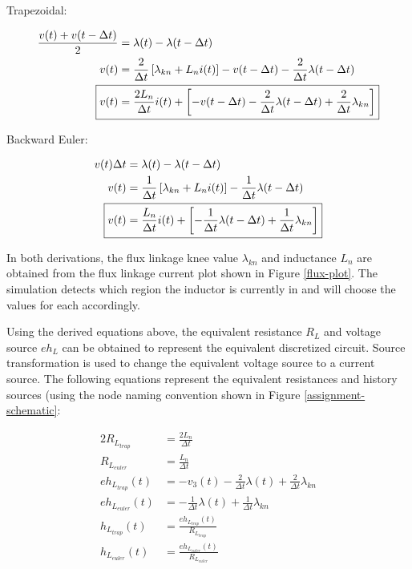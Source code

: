 \documentclass[10pt, oneside, letterpaper]{article}
\begin{document}
Trapezoidal:

\begin{alignat}{2}
\frac{v(t) + v(t-\Delta{}t)}{2} &= \lambda{}(t) - \lambda{}(t-\Delta{}t) \\
v(t) &= \frac{2}{\Delta{}t}\left[\lambda_{kn} + L_ni(t)\right] - v(t-\Delta{}t) - \frac{2}{\Delta{}t}\lambda{}(t - \Delta{}t) \\
\Aboxed{v(t) &= \frac{2L_n}{\Delta{}t}i(t) + \left[-v(t-\Delta{}t)-\frac{2}{\Delta{}t}\lambda{}(t - \Delta{}t) + \frac{2}{\Delta{}t}\lambda_{kn}\right]}
\end{alignat}

Backward Euler:

\begin{alignat}{2}
v(t)\Delta{}t &= \lambda{}(t) - \lambda{}(t-\Delta{}t) \\
v(t) &= \frac{1}{\Delta{}t}\left[\lambda_{kn} + L_ni(t)\right] - \frac{1}{\Delta{}t}\lambda{}(t - \Delta{}t) \\
\Aboxed{v(t) &= \frac{L_n}{\Delta{}t}i(t) + \left[-\frac{1}{\Delta{}t}\lambda{}(t - \Delta{}t) + \frac{1}{\Delta{}t}\lambda_{kn}\right]}
\end{alignat}

In both derivations, the flux linkage knee value $\lambda_{kn}$ and inductance $L_n$ are obtained from the flux linkage current plot shown in Figure \ref{flux-plot}. The simulation detects which region the inductor is currently in and will choose the values for each accordingly.

Using the derived equations above, the equivalent resistance $R_L$ and voltage source $eh_L$ can be obtained to represent the equivalent discretized circuit. Source transformation is used to change the equivalent voltage source to a current source. The following equations represent the equivalent resistances and history sources (using the node naming convention shown in Figure \ref{assignment-schematic}:

\begin{alignat}{2}
R_{L_{trap}} &= \frac{2L_n}{\Delta{}t} \\
R_{L_{euler}} &= \frac{L_n}{\Delta{}t} \\
eh_{L_{trap}}(t) &= -v_3(t) - \frac{2}{\Delta{}t}\lambda(t) + \frac{2}{\Delta{}t}\lambda_{kn}\\
eh_{L_{euler}}(t) &= -\frac{1}{\Delta{}t}\lambda(t) + \frac{1}{\Delta{}t}\lambda_{kn}\\
h_{L_{trap}}(t) &= \frac{eh_{L_{trap}}(t)}{R_{L_{trap}}}\\
h_{L_{euler}}(t) &= \frac{eh_{L_{euler}}(t)}{R_{L_{euler}}}
\end{alignat}
\end{document}
